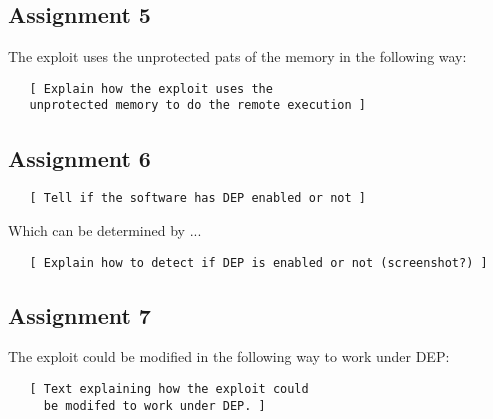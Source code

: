 \documentclass[10pt]{article}
\begin{document}

    \subsection{Assignment 5}

      The exploit uses the unprotected pats of the memory in the following way:

      \begin{verbatim}
   [ Explain how the exploit uses the
   unprotected memory to do the remote execution ]
      \end{verbatim}

    \subsection{Assignment 6}

      \begin{verbatim}
   [ Tell if the software has DEP enabled or not ]
      \end{verbatim}

      Which can be determined by ...

      \begin{verbatim}
   [ Explain how to detect if DEP is enabled or not (screenshot?) ]
      \end{verbatim}


    \subsection{Assignment 7}

      The exploit could be modified in the following way to work under DEP:

      \begin{verbatim}
   [ Text explaining how the exploit could
     be modifed to work under DEP. ]
      \end{verbatim}
\end{document}
